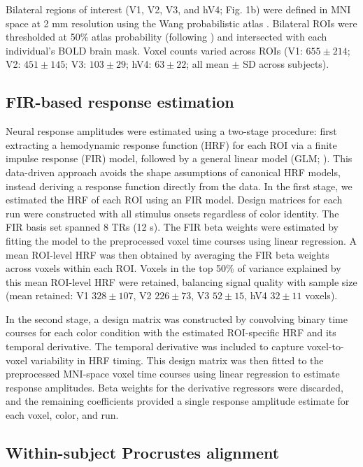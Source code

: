 Bilateral regions of interest (V1, V2, V3, and hV4; Fig. 1b) were defined in MNI space at 2 mm resolution using the Wang probabilistic atlas \cite{wang2015}. Bilateral ROIs were thresholded at 50\% atlas probability (following ) and intersected with each individual's BOLD brain mask. Voxel counts varied across ROIs (V1: $655 \pm 214$; V2: $451 \pm 145$; V3: $103 \pm 29$; hV4: $63 \pm 22$; all mean $\pm$ SD across subjects).

\subsection*{FIR-based response estimation}

Neural response amplitudes were estimated using a two-stage procedure: first extracting a hemodynamic response function (HRF) for each ROI via a finite impulse response (FIR) model, followed by a general linear model (GLM; ). This data-driven approach avoids the shape assumptions of canonical HRF models, instead deriving a response function directly from the data. In the first stage, we estimated the HRF of each ROI using an FIR model. Design matrices for each run were constructed with all stimulus onsets regardless of color identity. The FIR basis set spanned 8 TRs (12 s). The FIR beta weights were estimated by fitting the model to the preprocessed voxel time courses using linear regression. A mean ROI-level HRF was then obtained by averaging the FIR beta weights across voxels within each ROI. Voxels in the top 50\% of variance explained by this mean ROI-level HRF were retained, balancing signal quality with sample size (mean retained: V1 $328 \pm 107$, V2 $226 \pm 73$, V3 $52 \pm 15$, hV4 $32 \pm 11$ voxels).

In the second stage, a design matrix was constructed by convolving binary time courses for each color condition with the estimated ROI-specific HRF and its temporal derivative. The temporal derivative was included to capture voxel-to-voxel variability in HRF timing. This design matrix was then fitted to the preprocessed MNI-space voxel time courses using linear regression to estimate response amplitudes. Beta weights for the derivative regressors were discarded, and the remaining coefficients provided a single response amplitude estimate for each voxel, color, and run.

\subsection*{Within-subject Procrustes alignment}

